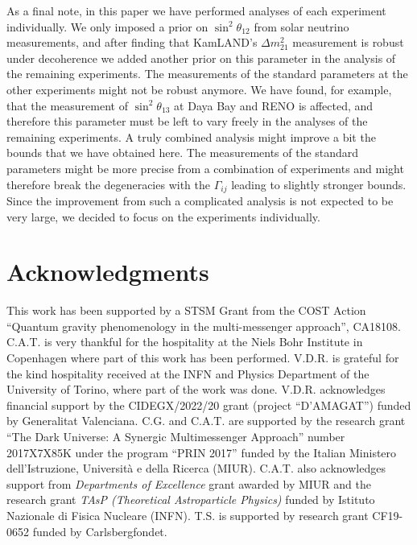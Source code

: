 \documentclass[aps, prd, onecolumn, tightenlines, notitlepage, superscriptaddress, nofootinbib, preprintnumbers, floatfix,showkeys,11pt]{revtex4-2}
\begin{document}
As a final note, in this paper we have performed analyses of each experiment individually. We only imposed a prior on $\sin^2\theta_{12}$ from solar neutrino measurements, and after finding that KamLAND's $\Delta m_{21}^2$ measurement is robust under decoherence we added another prior on this parameter in the analysis of the remaining experiments. The measurements of the standard parameters at the other experiments might not be robust anymore. We have found, for example, that the measurement of $\sin^2\theta_{13}$ at Daya Bay and RENO is affected, and therefore this parameter must be left to vary freely in the analyses of the remaining experiments. A truly combined analysis might improve a bit the bounds that we have obtained here. The measurements of the standard parameters might be more precise from a combination of experiments and might therefore break the degeneracies with the $\Gamma_{ij}$ leading to slightly stronger bounds. Since the improvement from such a complicated analysis is not expected to be very large, we decided to focus on the experiments individually.








\section*{Acknowledgments}
This work has been supported by a STSM Grant from the COST Action “Quantum gravity phenomenology in the multi-messenger approach”, CA18108.
%
C.A.T. is very thankful for the hospitality at the Niels Bohr Institute in Copenhagen where part of this work has been performed.
%
V.D.R. is grateful for the kind hospitality received at the INFN and Physics Department of the University of Torino, where part of the work was done.
%
V.D.R. acknowledges financial support by the CIDEGX/2022/20 grant (project ``D'AMAGAT'') funded by
Generalitat Valenciana. 
%
C.G. and C.A.T. are supported by the research grant ``The Dark Universe: A Synergic Multimessenger Approach'' number 2017X7X85K under the program ``PRIN 2017'' funded by the Italian Ministero dell'Istruzione, Universit\`a e della Ricerca (MIUR). C.A.T. also acknowledges support from {\sl Departments of Excellence} grant awarded by MIUR and the research grant {\sl TAsP (Theoretical Astroparticle Physics)} funded by Istituto Nazionale di Fisica Nucleare (INFN).
%
T.S. is supported by research grant CF19-0652 funded by Carlsbergfondet.
%



%  
\end{document}
